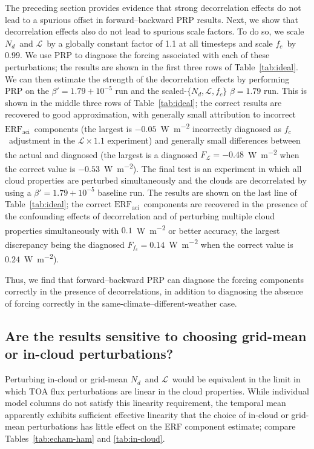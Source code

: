 \documentclass[acp, manuscript]{copernicus}\usepackage[]{graphicx}\usepackage[]{color}
\newcommand\nd{\ensuremath{N_d}}
\newcommand\cdnc{\nd}
\newcommand\lwp{\ensuremath{\mathcal L}}
\newcommand\fc{\ensuremath{f_c}}
\newcommand\cf{\fc}
\newcommand\erfaci{\ensuremath{\text{ERF}_\text{aci}}}
\begin{document}
The preceding section provides evidence that strong decorrelation effects do not
lead to a spurious offset in forward--backward PRP results.  Next, we show that
decorrelation effects also do not lead to spurious scale factors.  To do so, we
scale \nd\ and \lwp\ by a globally constant factor of 1.1 at all timesteps and
scale \cf\ by 0.99. We use PRP to diagnose the forcing associated with each of
these perturbations; the results are shown in the first three rows of
Table~\ref{tab:ideal}.  We can then estimate the strength of the decorrelation
effects by performing PRP on the $\beta' = 1.79 + 10^{-5}$ run and the
scaled-$\{\nd,\lwp,\cf\}$ $\beta = 1.79$ run.  This is shown in the middle three
rows of Table~\ref{tab:ideal}; the correct results are recovered to good
approximation, with generally small attribution to incorrect \erfaci\ components
(the largest is $-0.05$~\unit{W~m^{-2}} incorrectly diagnosed as \fc\ adjustment
in the $\lwp\times 1.1$ experiment) and generally small differences between the
actual and diagnosed (the largest is a diagnosed
$F_{\lwp} = -0.48$~\unit{W~m^{-2}} when the correct value is
$-0.53$~\unit{W~m^{-2}}).  The final test is an experiment in which all cloud
properties are perturbed simultaneously and the clouds are decorrelated by using
a $\beta' = 1.79 + 10^{-5}$ baseline run.  The results are shown on the last
line of Table~\ref{tab:ideal}; the correct \erfaci\ components are recovered in
the presence of the confounding effects of decorrelation and of perturbing
multiple cloud properties simultaneously with $0.1$~\unit{W~m^{-2}} or better
accuracy, the largest discrepancy being the diagnosed
$F_{\cf} = 0.14$~\unit{W~m^{-2}} when the correct value is
$0.24$~\unit{W~m^{-2}}).

Thus, we find that forward--backward PRP can diagnose the forcing components
correctly in the presence of decorrelations, in addition to diagnosing the
absence of forcing correctly in the same-climate--different-weather case.

\subsection{Are the results sensitive to choosing grid-mean or in-cloud perturbations?}
\label{sec:in-cloud}

Perturbing in-cloud or grid-mean \cdnc\ and \lwp\ would be equivalent in the
limit in which TOA flux perturbations are linear in the cloud properties.  While
individual model columns do not satisfy this linearity requirement, the temporal
mean apparently exhibits sufficient effective linearity that the choice of
in-cloud or grid-mean perturbations has little effect on the ERF component
estimate; compare Tables~\ref{tab:echam-ham} and \ref{tab:in-cloud}.
\end{document}
